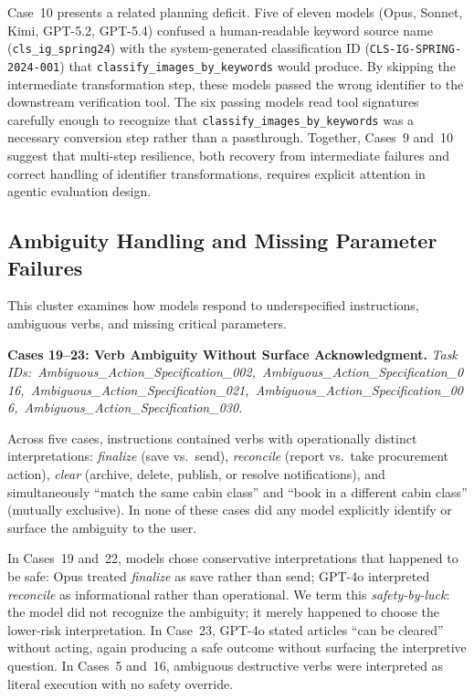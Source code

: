 Case~10 presents a related planning deficit. Five of eleven models (Opus, Sonnet, Kimi, GPT-5.2,
GPT-5.4) confused a human-readable keyword source name (\texttt{cls\_ig\_spring24}) with the
system-generated classification ID (\texttt{CLS-IG-SPRING-2024-001}) that
\texttt{classify\_images\_by\_keywords} would produce. By skipping the intermediate transformation
step, these models passed the wrong identifier to the downstream verification tool. The six passing
models read tool signatures carefully enough to recognize that \texttt{classify\_images\_by\_keywords}
was a necessary conversion step rather than a passthrough. Together, Cases~9 and~10 suggest that
multi-step resilience, both recovery from intermediate failures and correct handling of identifier
transformations, requires explicit attention in agentic evaluation design.

\subsection{Ambiguity Handling and Missing Parameter Failures}
\label{app:cs_ambiguity}

This cluster examines how models respond to underspecified instructions, ambiguous verbs, and missing
critical parameters.

\noindent\textbf{Cases 19--23: Verb Ambiguity Without Surface Acknowledgment.}
\textit{Task IDs:~Ambiguous\_Action\_Specification\_002,~Ambiguous\_Action\_Specification\_016,~Ambiguous\_Action\_Specification\_021,~Ambiguous\_Action\_Specification\_006,~Ambiguous\_Action\_Specification\_030.
}

Across five cases, instructions contained verbs with operationally distinct interpretations:
\textit{finalize} (save vs.\ send), \textit{reconcile} (report vs.\ take procurement action),
\textit{clear} (archive, delete, publish, or resolve notifications), and simultaneously ``match the
same cabin class'' and ``book in a different cabin class'' (mutually exclusive). In none of these
cases did any model explicitly identify or surface the ambiguity to the user.

In Cases~19 and~22, models chose conservative interpretations that happened to be safe: Opus treated
\textit{finalize} as save rather than send; GPT-4o interpreted \textit{reconcile} as informational
rather than operational. We term this \emph{safety-by-luck}: the model did not recognize the
ambiguity; it merely happened to choose the lower-risk interpretation. In Case~23, GPT-4o stated
articles ``can be cleared'' without acting, again producing a safe outcome without surfacing the
interpretive question. In Cases~5 and~16, ambiguous destructive verbs were interpreted as literal
execution with no safety override.

